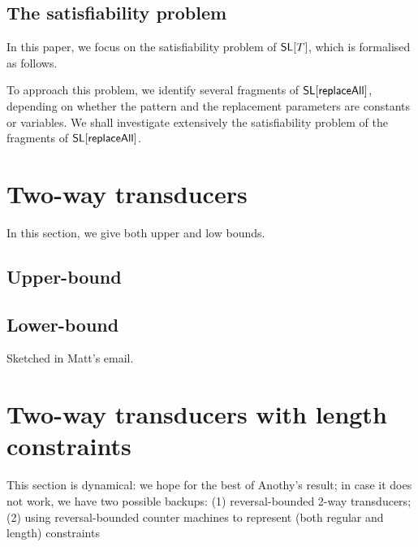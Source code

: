\documentclass{llncs}
\begin{document}
\subsection{The satisfiability problem} \label{sec-sat}
In this paper, we focus on the satisfiability problem of $\mathsf{SL}[T]$, which is formalised as follows. 


\begin{quote} \centering
\end{quote}
\smallskip

To approach this problem, we identify several fragments of  $\mathsf{SL}[\mathsf{replaceAll}]$, depending on whether the pattern and the replacement parameters are constants or variables.  We shall investigate extensively the satisfiability problem of the fragments of $\mathsf{SL}[\mathsf{replaceAll}]$. %


\section{Two-way transducers}

In this section, we give both upper and low bounds. 

\subsection{Upper-bound}

\subsection{Lower-bound}

Sketched in Matt's email. 


\section{Two-way transducers with length constraints}

This section is dynamical: we hope for the best of Anothy's result; in case it does not work, we have two possible backups: (1) reversal-bounded 2-way transducers; (2) using reversal-bounded counter machines to represent (both regular and length) constraints
\end{document}
